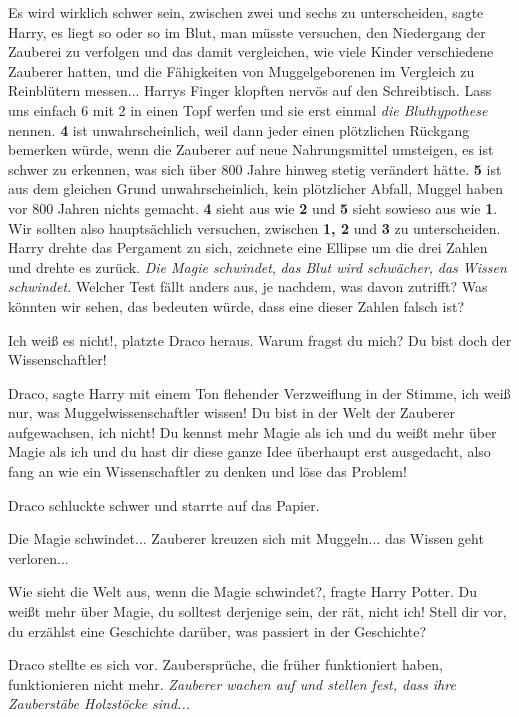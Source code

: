 \glqq{}Es wird wirklich schwer sein, zwischen zwei und sechs zu
unterscheiden\grqq{}, sagte Harry, \glqq{}es liegt so oder so im Blut, man
müsste versuchen, den Niedergang der Zauberei zu verfolgen und das damit
vergleichen, wie viele Kinder verschiedene Zauberer hatten, und die Fähigkeiten
von Muggelgeborenen im Vergleich zu Reinblütern messen...\grqq{} Harrys Finger
klopften nervös auf den Schreibtisch. \glqq{}Lass uns einfach 6 mit 2 in einen
Topf werfen und sie erst einmal \emph{die Bluthypothese} nennen. \textbf{4} ist
unwahrscheinlich, weil dann jeder einen plötzlichen Rückgang bemerken würde,
wenn die Zauberer auf neue Nahrungsmittel umsteigen, es ist schwer zu erkennen,
was sich über 800 Jahre hinweg stetig verändert hätte. \textbf{5} ist aus dem
gleichen Grund unwahrscheinlich, kein plötzlicher Abfall, Muggel haben vor 800
Jahren nichts gemacht. \textbf{4} sieht aus wie \textbf{2} und \textbf{5} sieht
sowieso aus wie \textbf{1}. Wir sollten also hauptsächlich versuchen, zwischen
\textbf{1, 2} und \textbf{3} zu unterscheiden.\grqq{} Harry drehte das Pergament
zu sich, zeichnete eine Ellipse um die drei Zahlen und drehte es zurück. \glqq
\emph{Die Magie schwindet}, \emph{das Blut wird schwächer,} \emph{das Wissen
schwindet.} Welcher Test fällt anders aus, je nachdem, was davon zutrifft? Was
könnten wir sehen, das bedeuten würde, dass eine dieser Zahlen falsch
ist?\grqq{}

\glqq{}Ich weiß es nicht!\grqq{}, platzte Draco heraus. \glqq{}Warum fragst du
mich? Du bist doch der Wissenschaftler!\grqq{}

\glqq{}Draco\grqq{}, sagte Harry mit einem Ton flehender Verzweiflung in der
Stimme, \glqq{}ich weiß nur, was Muggelwissenschaftler wissen! Du bist in der
Welt der Zauberer aufgewachsen, ich nicht! Du kennst mehr Magie als ich und du
weißt mehr über Magie als ich und du hast dir diese ganze Idee überhaupt erst
ausgedacht, also fang an wie ein Wissenschaftler zu denken und löse das
Problem!\grqq{}

Draco schluckte schwer und starrte auf das Papier.

Die Magie schwindet... Zauberer kreuzen sich mit Muggeln... das Wissen geht
verloren...

\glqq{}Wie sieht die Welt aus, wenn die Magie schwindet?\grqq{}, fragte Harry
Potter. \glqq{}Du weißt mehr über Magie, du solltest derjenige sein, der rät,
nicht ich! Stell dir vor, du erzählst eine Geschichte darüber, was passiert in
der Geschichte?\grqq{}

Draco stellte es sich vor. \glqq{}Zaubersprüche, die früher funktioniert haben,
funktionieren nicht mehr.\grqq{} \emph{Zauberer wachen auf und stellen fest,
dass ihre Zauberstäbe Holzstöcke sind...}

